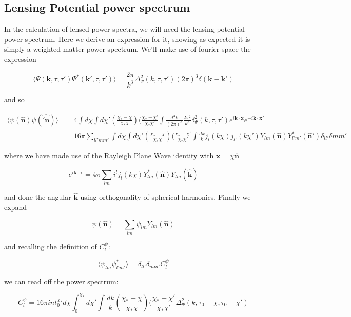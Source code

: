 \documentclass[a4paper,11pt]{article}
\renewcommand{\v}[1]{\mathbf{#1}}
\newcommand{\fint}[1]{\int \frac{d^3 #1}{(2\pi)^3}}
\newcommand{\unit}[1]{\hat{\v{#1}}}
\begin{document}
\subsection{Lensing Potential power spectrum}

In the calculation of lensed power spectra, we will need the lensing potential power spectrum. Here we derive an expression for it, showing as expected it is simply a weighted matter power spectrum. We'll make use of fourier space the expression

\begin{equation}
\langle \Psi(\v{k},\tau,\tau')\Psi^*(\v{k}',\tau,\tau')\rangle=\frac{2\pi}{k^3}\Delta^2_\Psi(k,\tau,\tau')(2\pi)^3\delta(\v{k}-\v{k}')
\end{equation}

and so 

\begin{align}
\langle \psi(\unit{n})\psi(\unit{'n}) \rangle &= 4\int d\chi \int d\chi'(\frac{\chi_*-\chi}{\chi_*\chi})(\frac{\chi_*-\chi'}{\chi_*\chi'}\fint{k}\frac{2\pi^2}{k^3}\delta^2_\Psi(k,\tau,\tau')e^{i\v{k}\cdot\v{x}}e^{-i\v{k}\cdot\v{x'}}\\
&= 16\pi \sum_{ll'mm'}\int d\chi \int d\chi'(\frac{\chi_*-\chi}{\chi_*\chi})(\frac{\chi_*-\chi'}{\chi_*\chi'}\int \frac{dk}{k}j_l(k\chi)j_{l'}(k\chi')Y_{lm}(\unit{n})Y^*_{l'm'}(\unit{n}')\delta_{ll'}\delta{mm'}
\end{align}

where we have made use of the Rayleigh Plane Wave identity with $\v{x}=\chi\unit{n}$

\begin{equation}
e^{i\v{k}\cdot\v{x}} = 4\pi\sum_{lm}i^lj_l(k\chi)Y_{lm}^*(\unit{n})Y_{lm}(\unit{k})
\end{equation}

and done the angular $\unit{k}$ using orthogonality of spherical harmonics. Finally we expand

\begin{equation}
\psi(\unit{n}) = \sum_{lm}\psi_{lm}Y_{lm}(\unit{n})
\end{equation}

and recalling the definition of $C_l^\psi$:

\begin{equation}
\langle \psi_{lm}\psi_{l'm'}^* \rangle = \delta_{ll'}\delta_{mm'}C_l^\psi
\end{equation}

we can read off the power spectrum:

\begin{equation}
C_l^\psi = 16\pi int_0^{\chi_*} d\chi \int_0^{\chi_*} d\chi' \int \frac{dk}{k} (\frac{\chi_*-\chi}{\chi_*\chi})(\frac{\chi_*-\chi'}{\chi_*\chi'}\Delta^2_\Psi(k, \tau_0-\chi, \tau_0-\chi')
\end{equation}
\end{document}
